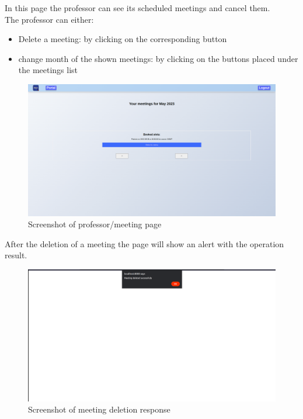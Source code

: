 In this page the professor can see its scheduled meetings and cancel them.\\
The professor can either:
\begin{itemize}
    \item Delete a meeting: by clicking on the corresponding button 
    \item change month of the shown meetings: by clicking on the buttons placed under the meetings list 
\end{itemize}
\begin{figure}[H]
    \centering
    \includegraphics[width=\textwidth]{img/user_manual/professor/Meetings.png}
    \caption{Screenshot of professor/meeting page}
\end{figure}

After the deletion of a meeting the page will show an alert with the operation result.
\begin{figure}[H]
    \centering
    \includegraphics[width=\textwidth]{img/user_manual/professor/meeting-response.png}
    \caption{Screenshot of meeting deletion response}
\end{figure}